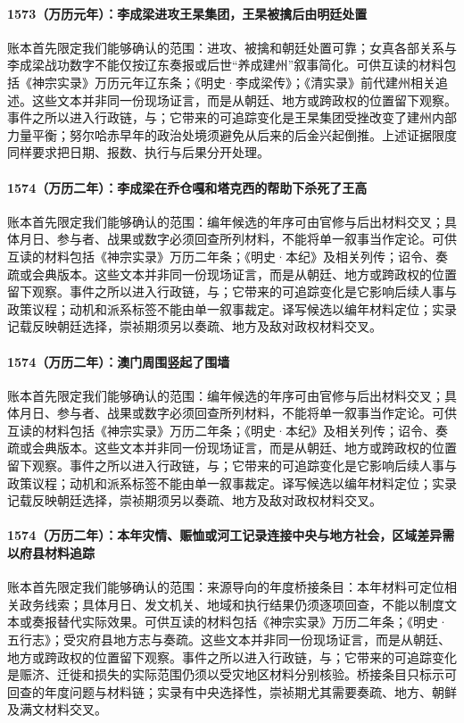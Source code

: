 \paragraph{1573（万历元年）：李成梁进攻王杲集团，王杲被擒后由明廷处置} 账本首先限定我们能够确认的范围：进攻、被擒和朝廷处置可靠；女真各部关系与李成梁战功数字不能仅按辽东奏报或后世“养成建州”叙事简化。可供互读的材料包括《神宗实录》万历元年辽东条；《明史·李成梁传》；《清实录》前代建州相关追述。这些文本并非同一份现场证言，而是从朝廷、地方或跨政权的位置留下观察。事件之所以进入行政链，与；它带来的可追踪变化是王杲集团受挫改变了建州内部力量平衡；努尔哈赤早年的政治处境须避免从后来的后金兴起倒推。上述证据限度同样要求把日期、报数、执行与后果分开处理。

\paragraph{1574（万历二年）：李成梁在乔仓嘎和塔克西的帮助下杀死了王高} 账本首先限定我们能够确认的范围：编年候选的年序可由官修与后出材料交叉；具体月日、参与者、战果或数字必须回查所列材料，不能将单一叙事当作定论。可供互读的材料包括《神宗实录》万历二年条；《明史·本纪》及相关列传；诏令、奏疏或会典版本。这些文本并非同一份现场证言，而是从朝廷、地方或跨政权的位置留下观察。事件之所以进入行政链，与；它带来的可追踪变化是它影响后续人事与政策议程；动机和派系标签不能由单一叙事裁定。译写候选以编年材料定位；实录记载反映朝廷选择，崇祯期须另以奏疏、地方及敌对政权材料交叉。

\paragraph{1574（万历二年）：澳门周围竖起了围墙} 账本首先限定我们能够确认的范围：编年候选的年序可由官修与后出材料交叉；具体月日、参与者、战果或数字必须回查所列材料，不能将单一叙事当作定论。可供互读的材料包括《神宗实录》万历二年条；《明史·本纪》及相关列传；诏令、奏疏或会典版本。这些文本并非同一份现场证言，而是从朝廷、地方或跨政权的位置留下观察。事件之所以进入行政链，与；它带来的可追踪变化是它影响后续人事与政策议程；动机和派系标签不能由单一叙事裁定。译写候选以编年材料定位；实录记载反映朝廷选择，崇祯期须另以奏疏、地方及敌对政权材料交叉。

\paragraph{1574（万历二年）：本年灾情、赈恤或河工记录连接中央与地方社会，区域差异需以府县材料追踪} 账本首先限定我们能够确认的范围：来源导向的年度桥接条目：本年材料可定位相关政务线索；具体月日、发文机关、地域和执行结果仍须逐项回查，不能以制度文本或奏报替代实际效果。可供互读的材料包括《神宗实录》万历二年条；《明史·五行志》；受灾府县地方志与奏疏。这些文本并非同一份现场证言，而是从朝廷、地方或跨政权的位置留下观察。事件之所以进入行政链，与；它带来的可追踪变化是赈济、迁徙和损失的实际范围仍须以受灾地区材料分别核验。桥接条目只标示可回查的年度问题与材料链；实录有中央选择性，崇祯期尤其需要奏疏、地方、朝鲜及满文材料交叉。

